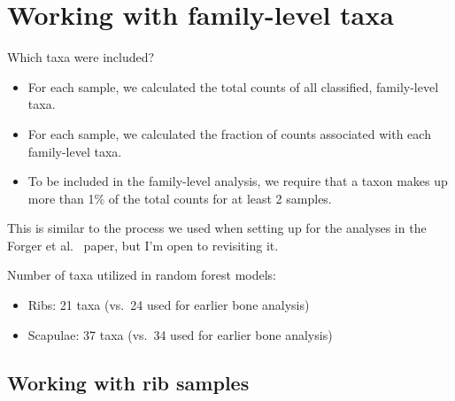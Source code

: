 \documentclass{beamer}
\begin{document}
\section[Family-level taxa]{Working with family-level taxa}

\begin{frame}{Which taxa were included?}

  \begin{itemize}
  \item For each sample, we calculated the total counts of all classified,
family-level taxa.
  \item For each sample, we calculated the fraction of counts
associated with each family-level taxa. 
  \item To be included in the family-level analysis, we require that a taxon
  makes up more than 1\% of the total counts for at least 2 samples.
  \end{itemize}

  \vspace{0.1in}

  \noindent This is similar to the process we used when setting up for the
analyses in the Forger et al.~ paper, but I'm open to revisiting it.

  \vspace{0.1in}

  \noindent Number of taxa utilized in random forest models:
  \begin{itemize}
    \item Ribs: 21 taxa (vs.\ 24 used for earlier bone analysis)
    \item Scapulae: 37 taxa (vs.\ 34 used for earlier bone analysis)
  \end{itemize}


\end{frame}



\subsection[Ribs]{Working with rib samples}
\end{document}
